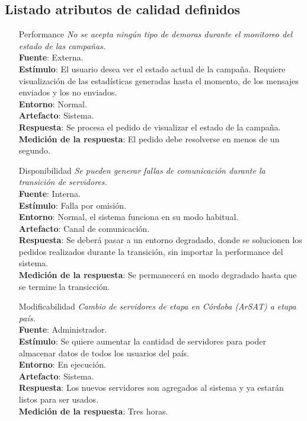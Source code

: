 \documentclass[a4paper, 11pt]{article}
\begin{document}
\subsection{Listado atributos de calidad definidos}
\begin{itemize}

\item[Performance] \textit{No se acepta ningún tipo de demoras durante el monitoreo del estado de las campañas.}\\
\textbf{Fuente}: Externa. \\
\textbf{Estímulo}: El usuario desea ver el estado actual de la campaña. Requiere visualización de las estadísticas generadas hasta el momento, de los mensajes enviados y los no enviados. \\
\textbf{Entorno}: Normal.\\
\textbf{Artefacto}: Sistema.\\
\textbf{Respuesta}: Se procesa el pedido de visualizar el estado de la campaña.\\
\textbf{Medición de la respuesta}: El pedido debe resolverse en menos de un segundo. \\

\item[Disponibilidad] \textit{Se pueden generar fallas de comunicación durante la transición de servidores.}\\
\textbf{Fuente}: Interna.\\
\textbf{Estímulo}: Falla por omisión.\\
\textbf{Entorno}: Normal, el sistema funciona en su modo habitual.\\
\textbf{Artefacto}: Canal de comunicación.\\
\textbf{Respuesta}: Se deberá pasar a un entorno degradado, donde se solucionen los pedidos realizados durante la transición, sin importar la performance del sistema.\\
\textbf{Medición de la respuesta}:  Se permanecerá en modo degradado hasta que se termine la transicción.\\

\item[Modificabilidad] \textit{Cambio de servidores de etapa en Córdoba (ArSAT) a etapa país.}\\
\textbf{Fuente}: Administrador. \\
\textbf{Estímulo}: Se quiere aumentar la cantidad de servidores para poder almacenar datos de todos los usuarios del país. \\
\textbf{Entorno}: En ejecución. \\
\textbf{Artefacto}: Sistema. \\
\textbf{Respuesta}: Los nuevos servidores son agregados al sistema y ya estarán listos para ser usados. \\
\textbf{Medición de la respuesta}:  Tres horas.\\


\end{itemize}
\end{document}
